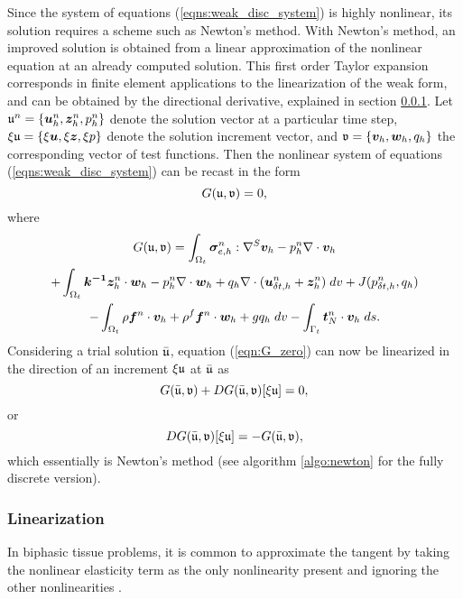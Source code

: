 Since the system of equations (\ref{eqns:weak_disc_system}) is highly nonlinear, its solution requires a scheme such as Newton's method. With Newton's method, an improved solution is obtained from a linear approximation of the nonlinear equation at an already computed solution. This first order Taylor expansion corresponds in finite element applications to the linearization of the weak form, and can be obtained by the directional derivative, explained in section \ref{sec:linearization}. Let ${\mathfrak{u}}^{n}=\{ \boldsymbol{u}_{h}^{n}, \boldsymbol{z}_{h}^{n}, p_{h}^{n} \} $ denote the solution vector at a particular time step, ${\xi \mathfrak{u}}=\{ \xi\boldsymbol{u},  \xi\boldsymbol{z}, \xi p \} $ denote the solution increment vector, and ${\mathfrak{v}}=\{ \boldsymbol{v}_{h}, \boldsymbol{w}_{h}, {q}_{h} \} $ the corresponding vector of test functions. Then the nonlinear system of equations (\ref{eqns:weak_disc_system}) can be recast in the form
\begin{equation}
 G({\mathfrak{u}},{\mathfrak{v}})=0,
  \label{eqn:G_zero}
\end{equation}
where
\begin{multline}
G({\mathfrak{u}},{\mathfrak{v}})=
\int_{\Omega_{t}}  \boldsymbol{\sigma}^{n}_{e,h}
                :  \nabla^{S} \boldsymbol{v}_{h} 
- p_{h}^{n}  \nabla\cdot \boldsymbol{v}_{h}  \\
+ \int_{\Omega_{t}}\boldsymbol{k^{-1}} \boldsymbol{z}_{h}^{n} \cdot \boldsymbol{w}_{h}
- p_{h}^{n}  \nabla \cdot \boldsymbol{w}_{h} + {q}_{h}\nabla \cdot ( {{\boldsymbol{u}_{\delta t,h}^{n}}} +  \boldsymbol{z}_{h}^{n} ) \;dv  + J({{p}_{\delta t,h}^{n}},{q}_{h})\\
- \int_{\Omega_{t}} \rho \boldsymbol{f}^{n}  \cdot \boldsymbol{v}_{h}
+ \rho^{f} \boldsymbol{f}^{n} \cdot \boldsymbol{w}_{h}
+ g {q}_{h} \; dv
- \int_{\Gamma_{t}}   \boldsymbol{t}_{N}^{n}  \cdot \boldsymbol{v}_{h}  \; ds.
 \label{eqn:G_defintion}
\end{multline}
Considering a trial solution $ \bar{\mathfrak{u}}$, equation (\ref{eqn:G_zero}) can now be linearized in the direction of an increment ${\xi \mathfrak{u}}$ at $\bar{\mathfrak{u}}$ as
\begin{equation}
 G(\bar{\mathfrak{u}},{\mathfrak{v}}) + DG(\bar{\mathfrak{u}},{\mathfrak{v}})[ {\xi \mathfrak{u}}] =0,
\end{equation}
or
\begin{equation}
 DG(\bar{\mathfrak{u}},{\mathfrak{v}})[ {\xi \mathfrak{u}}]= - G(\bar{\mathfrak{u}},{\mathfrak{v}}),
\end{equation}
which essentially is Newton's method (see algorithm \ref{algo:newton} for the fully discrete version).

\subsubsection{Linearization}
\label{sec:linearization}
In biphasic tissue problems, it is common to approximate the tangent by taking the nonlinear elasticity term as the only nonlinearity present and ignoring the other nonlinearities \cite{un2006penetration,white2008stabilized}. 


